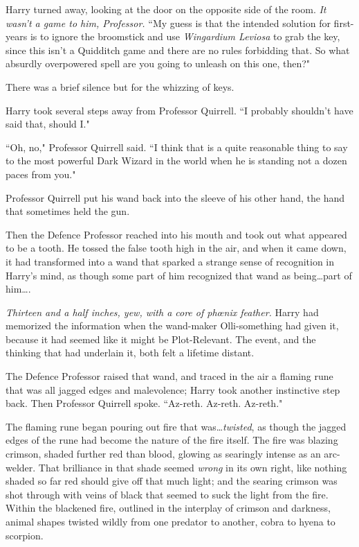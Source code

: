 Harry turned away, looking at the door on the opposite side of the room. \emph{It wasn't a game to him, Professor.} ``My guess is that the intended solution for first-years is to ignore the broomstick and use \emph{Wingardium Leviosa} to grab the key, since this isn't a Quidditch game and there are no rules forbidding that. So what absurdly overpowered spell are you going to unleash on this one, then?"

There was a brief silence but for the whizzing of keys.

Harry took several steps away from Professor Quirrell. ``I probably shouldn't have said that, should I."

``Oh, no," Professor Quirrell said. ``I think that is a quite reasonable thing to say to the most powerful Dark Wizard in the world when he is standing not a dozen paces from you."

Professor Quirrell put his wand back into the sleeve of his other hand, the hand that sometimes held the gun.

Then the Defence Professor reached into his mouth and took out what appeared to be a tooth. He tossed the false tooth high in the air, and when it came down, it had transformed into a wand that sparked a strange sense of recognition in Harry's mind, as though some part of him recognized that wand as being…part of him….

\emph{Thirteen and a half inches, yew, with a core of phœnix feather.} Harry had memorized the information when the wand-maker Olli-something had given it, because it had seemed like it might be Plot-Relevant. The event, and the thinking that had underlain it, both felt a lifetime distant.

The Defence Professor raised that wand, and traced in the air a flaming rune that was all jagged edges and malevolence; Harry took another instinctive step back. Then Professor Quirrell spoke. ``Az-reth. Az-reth. Az-reth."

The flaming rune began pouring out fire that was…\emph{twisted}, as though the jagged edges of the rune had become the nature of the fire itself. The fire was blazing crimson, shaded further red than blood, glowing as searingly intense as an arc-welder. That brilliance in that shade seemed \emph{wrong} in its own right, like nothing shaded so far red should give off that much light; and the searing crimson was shot through with veins of black that seemed to suck the light from the fire. Within the blackened fire, outlined in the interplay of crimson and darkness, animal shapes twisted wildly from one predator to another, cobra to hyena to scorpion.

